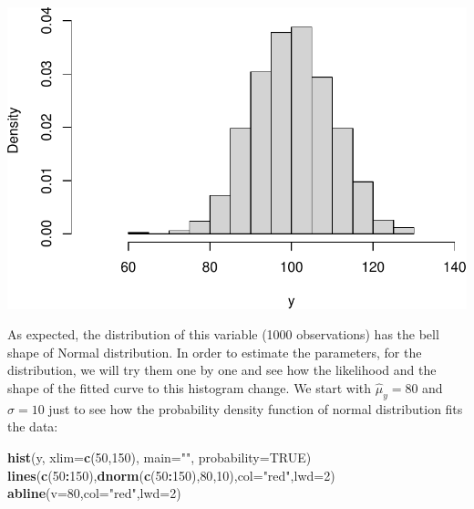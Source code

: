 \documentclass[
]{book}
\newenvironment{Shaded}{\begin{snugshade}}{\end{snugshade}}
\newcommand{\AttributeTok}[1]{\textcolor[rgb]{0.13,0.29,0.53}{#1}}
\newcommand{\ConstantTok}[1]{\textcolor[rgb]{0.56,0.35,0.01}{#1}}
\newcommand{\DecValTok}[1]{\textcolor[rgb]{0.00,0.00,0.81}{#1}}
\newcommand{\FunctionTok}[1]{\textcolor[rgb]{0.13,0.29,0.53}{\textbf{#1}}}
\newcommand{\NormalTok}[1]{#1}
\newcommand{\SpecialCharTok}[1]{\textcolor[rgb]{0.81,0.36,0.00}{\textbf{#1}}}
\newcommand{\StringTok}[1]{\textcolor[rgb]{0.31,0.60,0.02}{#1}}
\theoremstyle{definition}
\theoremstyle{definition}
\theoremstyle{definition}
\theoremstyle{definition}
\theoremstyle{remark}
\begin{document}
\includegraphics{Svetunkov---Statistics-for-Business-Analytics_files/figure-latex/unnamed-chunk-112-1.pdf}

As expected, the distribution of this variable (1000 observations) has the bell shape of Normal distribution. In order to estimate the parameters, for the distribution, we will try them one by one and see how the likelihood and the shape of the fitted curve to this histogram change. We start with \(\hat{\mu}_y=80\) and \(\hat{\sigma}=10\) just to see how the probability density function of normal distribution fits the data:

\begin{Shaded}
\begin{Highlighting}[]
\FunctionTok{hist}\NormalTok{(y, }\AttributeTok{xlim=}\FunctionTok{c}\NormalTok{(}\DecValTok{50}\NormalTok{,}\DecValTok{150}\NormalTok{), }\AttributeTok{main=}\StringTok{""}\NormalTok{, }\AttributeTok{probability=}\ConstantTok{TRUE}\NormalTok{)}
\FunctionTok{lines}\NormalTok{(}\FunctionTok{c}\NormalTok{(}\DecValTok{50}\SpecialCharTok{:}\DecValTok{150}\NormalTok{),}\FunctionTok{dnorm}\NormalTok{(}\FunctionTok{c}\NormalTok{(}\DecValTok{50}\SpecialCharTok{:}\DecValTok{150}\NormalTok{),}\DecValTok{80}\NormalTok{,}\DecValTok{10}\NormalTok{),}\AttributeTok{col=}\StringTok{"red"}\NormalTok{,}\AttributeTok{lwd=}\DecValTok{2}\NormalTok{)}
\FunctionTok{abline}\NormalTok{(}\AttributeTok{v=}\DecValTok{80}\NormalTok{,}\AttributeTok{col=}\StringTok{"red"}\NormalTok{,}\AttributeTok{lwd=}\DecValTok{2}\NormalTok{)}
\end{Highlighting}
\end{Shaded}
\end{document}
